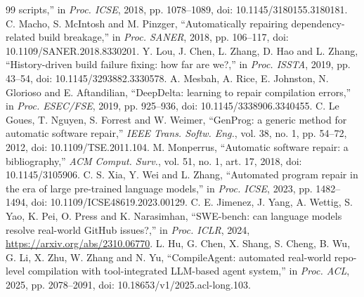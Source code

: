 \documentclass[conference]{IEEEtran}
\begin{document}
\begin{thebibliography}{99}
scripts,'' in \emph{Proc. ICSE}, 2018, pp. 1078--1089, doi: 10.1145/3180155.3180181.
 C. Macho, S. McIntosh and M. Pinzger, ``Automatically repairing dependency-related build
breakage,'' in \emph{Proc. SANER}, 2018, pp. 106--117, doi: 10.1109/SANER.2018.8330201.
 Y. Lou, J. Chen, L. Zhang, D. Hao and L. Zhang, ``History-driven build failure fixing: how far
are we?,'' in \emph{Proc. ISSTA}, 2019, pp. 43--54, doi: 10.1145/3293882.3330578.
 A. Mesbah, A. Rice, E. Johnston, N. Glorioso and E. Aftandilian, ``DeepDelta: learning to
repair compilation errors,'' in \emph{Proc. ESEC/FSE}, 2019, pp. 925--936, doi: 10.1145/3338906.3340455.
 C. Le Goues, T. Nguyen, S. Forrest and W. Weimer, ``GenProg: a generic method for automatic
software repair,'' \emph{IEEE Trans. Softw. Eng.}, vol. 38, no. 1, pp. 54--72, 2012, doi: 10.1109/TSE.2011.104.
 M. Monperrus, ``Automatic software repair: a bibliography,'' \emph{ACM Comput. Surv.},
vol. 51, no. 1, art. 17, 2018, doi: 10.1145/3105906.
 C. S. Xia, Y. Wei and L. Zhang, ``Automated program repair in the era of large pre-trained
language models,'' in \emph{Proc. ICSE}, 2023, pp. 1482--1494, doi: 10.1109/ICSE48619.2023.00129.
 C. E. Jimenez, J. Yang, A. Wettig, S. Yao, K. Pei, O. Press and K. Narasimhan, ``SWE-bench:
can language models resolve real-world GitHub issues?,'' in \emph{Proc. ICLR}, 2024,
\url{https://arxiv.org/abs/2310.06770}.
 L. Hu, G. Chen, X. Shang, S. Cheng, B. Wu, G. Li, X. Zhu, W. Zhang and N. Yu, ``CompileAgent:
automated real-world repo-level compilation with tool-integrated LLM-based agent system,'' in \emph{Proc. ACL},
2025, pp. 2078--2091, doi: 10.18653/v1/2025.acl-long.103.
\end{thebibliography}
\end{document}
